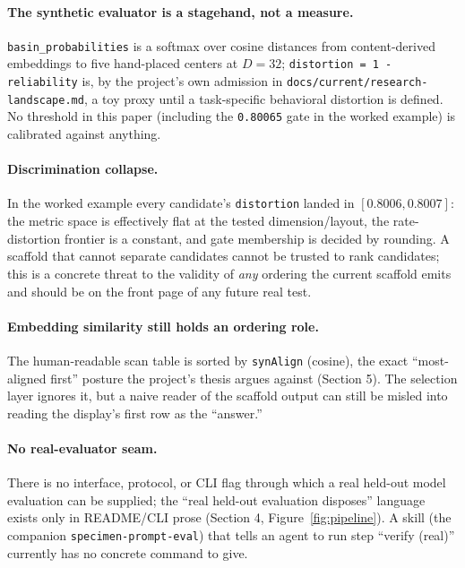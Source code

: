 \paragraph{The synthetic evaluator is a stagehand, not a measure.}
\texttt{basin\_probabilities} is a softmax over cosine distances from
content-derived embeddings to five hand-placed centers at $D=32$;
\texttt{distortion = 1 - reliability} is, by the project's own admission in
\texttt{docs/current/research-landscape.md}, a toy proxy until a
task-specific behavioral distortion is defined. No threshold in this paper
(including the \texttt{0.80065} gate in the worked example) is calibrated
against anything.

\paragraph{Discrimination collapse.} In the worked example every candidate's
\texttt{distortion} landed in $[0.8006,0.8007]$: the metric space is
effectively flat at the tested dimension/layout, the rate-distortion frontier is
a constant, and gate membership is decided by rounding. A scaffold that cannot
separate candidates cannot be trusted to rank candidates; this is a concrete
threat to the validity of \emph{any} ordering the current scaffold emits and
should be on the front page of any future real test.

\paragraph{Embedding similarity still holds an ordering role.}
The human-readable scan table is sorted by \texttt{synAlign} (cosine), the
exact ``most-aligned first'' posture the project's thesis argues against
(Section 5). The selection layer ignores it, but a naive reader of the scaffold
output can still be misled into reading the display's first row as the
``answer.''

\paragraph{No real-evaluator seam.}
There is no interface, protocol, or CLI flag through which a real held-out
model evaluation can be supplied; the ``real held-out evaluation disposes''
language exists only in README/CLI prose (Section 4, Figure~\ref{fig:pipeline}).
A skill (the companion \texttt{specimen-prompt-eval}) that tells an agent to run
step ``verify (real)'' currently has no concrete command to give.

